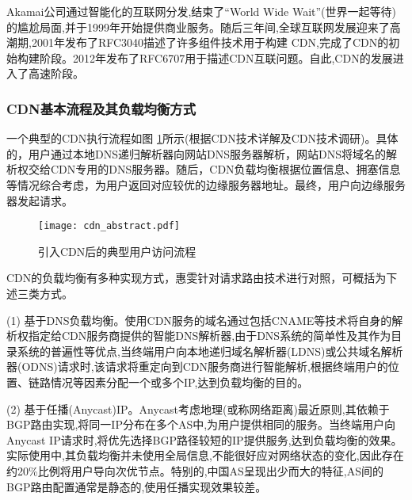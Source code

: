 Akamai公司通过智能化的互联网分发,结束了“World Wide Wait”(世界一起等待)的尴尬局面,并于1999年开始提供商业服务。随后三年间,全球互联网发展迎来了高潮期,2001年发布了RFC3040\cite{RFC-3040}描述了许多组件技术用于构建 CDN,完成了CDN的初始构建阶段。2012年发布了RFC6707\cite{RFC-6707}用于描述CDN互联问题。自此,CDN的发展进入了高速阶段。 

\subsubsection{CDN基本流程及其负载均衡方式}

一个典型的CDN执行流程如图 \ref{fig:join_cdn_classic}所示(根据CDN技术详解\cite{leibaohua-CDN-2012}及CDN技术调研\cite{Pathan-survey-2007})。具体的，用户通过本地DNS递归解析器向网站DNS服务器解析，网站DNS将域名的解析权交给CDN专用的DNS服务器。随后，CDN负载均衡根据位置信息、拥塞信息等情况综合考虑，为用户返回对应较优的边缘服务器地址。最终，用户向边缘服务器发起请求。

 
\begin{figure}[ht]
	\centering
	\texttt{[image: cdn\_abstract.pdf]}
	\caption{引入CDN后的典型用户访问流程}
	\label{fig:join_cdn_classic}
\end{figure}

\FloatBarrier


CDN的负载均衡有多种实现方式，惠雯\cite{惠雯2012内容分发网络请求路由研究}针对请求路由技术进行对照，可概括为下述三类方式。



	(1) 基于DNS负载均衡。使用CDN服务的域名通过包括CNAME等技术\cite{Choffnes2017}将自身的解析权指定给CDN服务商提供的智能DNS解析器,由于DNS系统的简单性及其作为目录系统的普遍性\cite{Pathan-survey-2007}等优点,当终端用户向本地递归域名解析器(LDNS)或公共域名解析器(ODNS)请求时,该请求将重定向到CDN服务商进行智能解析,根据终端用户的位置、链路情况等因素分配一个或多个IP,达到负载均衡的目的。

	(2) 基于任播(Anycast)IP。Anycast考虑地理(或称网络距离)最近原则,其依赖于BGP路由实现,将同一IP分布在多个AS中,为用户提供相同的服务。当终端用户向Anycast IP请求时,将优先选择BGP路径较短的IP提供服务,达到负载均衡的效果。实际使用中,其负载均衡并未使用全局信息\cite{Calder2015},不能很好应对网络状态的变化\cite{Choffnes2017},因此存在约20\%比例将用户导向次优节点。特别的,中国AS呈现出少而大的特征,AS间的BGP路由配置通常是静态的\cite{Choffnes2017},使用任播实现效果较差。

